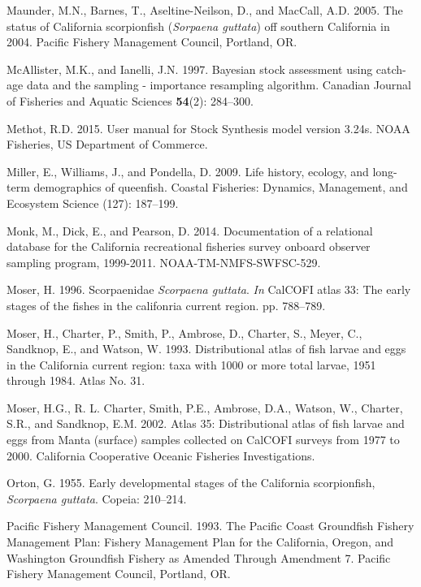 \documentclass[12pt,]{article}
\begin{document}
\hypertarget{ref-Maunder2005}{}
Maunder, M.N., Barnes, T., Aseltine-Neilson, D., and MacCall, A.D. 2005.
The status of California scorpionfish (\emph{Sorpaena guttata}) off
southern California in 2004. Pacific Fishery Management Council,
Portland, OR.

\hypertarget{ref-McAllister1997}{}
McAllister, M.K., and Ianelli, J.N. 1997. Bayesian stock assessment
using catch-age data and the sampling - importance resampling algorithm.
Canadian Journal of Fisheries and Aquatic Sciences \textbf{54}(2):
284--300.

\hypertarget{ref-Methot2015}{}
Methot, R.D. 2015. User manual for Stock Synthesis model version 3.24s.
NOAA Fisheries, US Department of Commerce.

\hypertarget{ref-Miller2009}{}
Miller, E., Williams, J., and Pondella, D. 2009. Life history, ecology,
and long-term demographics of queenfish. Coastal Fisheries: Dynamics,
Management, and Ecosystem Science (127): 187--199.

\hypertarget{ref-Monk2014}{}
Monk, M., Dick, E., and Pearson, D. 2014. Documentation of a relational
database for the California recreational fisheries survey onboard
observer sampling program, 1999-2011. NOAA-TM-NMFS-SWFSC-529.

\hypertarget{ref-Moser1996}{}
Moser, H. 1996. Scorpaenidae \emph{Scorpaena guttata}. \emph{In} CalCOFI
atlas 33: The early stages of the fishes in the califonria current
region. pp. 788--789.

\hypertarget{ref-Moser1993}{}
Moser, H., Charter, P., Smith, P., Ambrose, D., Charter, S., Meyer, C.,
Sandknop, E., and Watson, W. 1993. Distributional atlas of fish larvae
and eggs in the California current region: taxa with 1000 or more total
larvae, 1951 through 1984. Atlas No. 31.

\hypertarget{ref-Moser2002}{}
Moser, H.G., R. L. Charter, Smith, P.E., Ambrose, D.A., Watson, W.,
Charter, S.R., and Sandknop, E.M. 2002. Atlas 35: Distributional atlas
of fish larvae and eggs from Manta (surface) samples collected on
CalCOFI surveys from 1977 to 2000. California Cooperative Oceanic
Fisheries Investigations.

\hypertarget{ref-Orton1955}{}
Orton, G. 1955. Early developmental stages of the California
scorpionfish, \emph{Scorpaena guttata}. Copeia: 210--214.

\hypertarget{ref-PFMC1993}{}
Pacific Fishery Management Council. 1993. The Pacific Coast Groundfish
Fishery Management Plan: Fishery Management Plan for the California,
Oregon, and Washington Groundfish Fishery as Amended Through Amendment
7. Pacific Fishery Management Council, Portland, OR.
\end{document}
